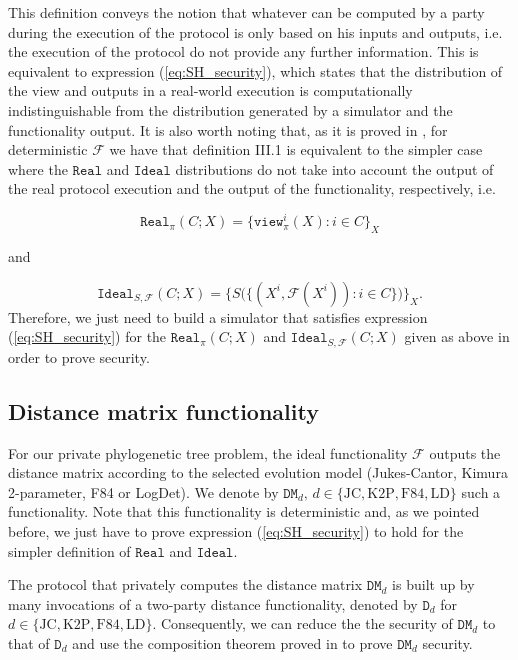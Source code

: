 This definition conveys the notion that whatever can be computed by a party during the execution of the protocol is only based on his inputs and outputs, i.e. the execution of the protocol do not provide any further information. This is equivalent to expression (\ref{eq:SH_security}), which states that the distribution of the view and outputs in a real-world execution is computationally indistinguishable from the distribution generated by a simulator and the functionality output. It is also worth noting that, as it is proved in \cite{Lindell2017}, for deterministic $\mathcal{F}$ we have that definition III.1 is equivalent to the simpler case where the $\mathtt{Real}$ and $\mathtt{Ideal}$ distributions do not take into account the output of the real protocol execution and the output of the functionality, respectively, i.e.

$$\mathtt{Real}_\pi(C; X) = \{ \mathtt{view}^i_\pi(X) : i\in C \}_X$$

and

$$\mathtt{Ideal}_{S, \mathcal{F}}(C; X) = \big\{ S\big(\{(X^i, \mathcal{F}(X^i)) : i\in C \}\big) \big\}_{X}.$$
Therefore, we just need to build a simulator that satisfies expression (\ref{eq:SH_security}) for the $\mathtt{Real}_\pi(C; X)$ and $\mathtt{Ideal}_{S, \mathcal{F}}(C; X)$ given as above in order to prove security.

\subsection{Distance matrix functionality}

For our private phylogenetic tree problem, the ideal functionality $\mathcal{F}$ outputs the distance matrix according to the selected evolution model (Jukes-Cantor, Kimura 2-parameter, F84 or LogDet). We denote by $\mathtt{DM}_{d},\, d\in\{\text{JC}, \text{K2P}, \text{F84}, \text{LD}\}$ such a functionality. Note that this functionality is deterministic and, as we pointed before, we just have to prove expression (\ref{eq:SH_security}) to hold for the simpler definition of $\mathtt{Real}$ and $\mathtt{Ideal}$.

The protocol that privately computes the distance matrix $\mathtt{DM}_{d}$ is built up by many invocations of a two-party distance functionality, denoted by $\mathtt{D}_d$ for $d\in\{\text{JC}, \text{K2P}, \text{F84}, \text{LD}\}$. Consequently, we can reduce the the security of $\mathtt{DM}_{d}$ to that of $\mathtt{D}_d$ and use the composition theorem proved in \cite{Goldreich98} %
to prove $\mathtt{DM}_{d}$ security. 

